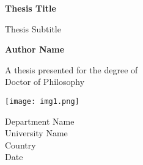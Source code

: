 	\begin{titlepage}
		\begin{center}
	        \vspace*{1cm}
	 
	        \Huge
	        \textbf{Thesis Title}
	 
	        \vspace{0.5cm}
	        \LARGE
	        Thesis Subtitle
	 
	        \vspace{1.5cm}
	 
	        \textbf{Author Name}
	 
	        \vfill
	 
	        A thesis presented for the degree of\\
	        Doctor of Philosophy
	 
	        \vspace{0.8cm}
	 
	        \texttt{[image: img1.png]}
	 
	        \Large
	        Department Name\\
	        University Name\\
	        Country\\
	        Date
	 
	    \end{center}
	\end{titlepage}